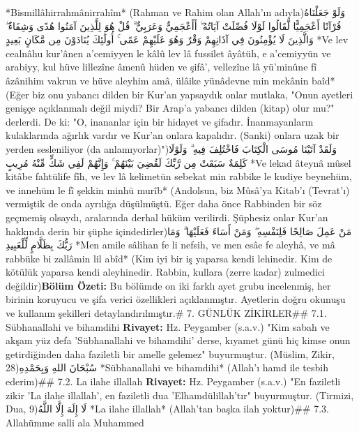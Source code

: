 \documentclass[12pt,a4paper]{article}
\begin{document}
{*Bismillâhirrahmânirrahîm*
(Rahman ve Rahim olan Allah'ın adıyla)وَلَوْ جَعَلْنَاهُ قُرْآنًا أَعْجَمِيًّا لَّقَالُوا لَوْلَا فُصِّلَتْ آيَاتُهُ ۖ أَأَعْجَمِيٌّ وَعَرَبِيٌّ ۗ قُلْ هُوَ لِلَّذِينَ آمَنُوا هُدًى وَشِفَاءٌ ۖ وَالَّذِينَ لَا يُؤْمِنُونَ فِي آذَانِهِمْ وَقْرٌ وَهُوَ عَلَيْهِمْ عَمًى ۚ أُولَٰئِكَ يُنَادَوْنَ مِن مَّكَانٍ بَعِيدٍ
*Ve lev cealnâhu kur'ânen a'cemiyyen le kâlû lev lâ fussilet âyâtüh, e a'cemiyyün ve arabiyy, kul hüve lillezîne âmenû hüden ve şifâ', vellezîne lâ yü'minûne fî âzânihim vakrun ve hüve aleyhim amâ, ülâike yünâdevne min mekânin baîd*
(Eğer biz onu yabancı dilden bir Kur'an yapsaydık onlar mutlaka, "Onun ayetleri genişçe açıklanmalı değil miydi? Bir Arap'a yabancı dilden (kitap) olur mu?" derlerdi. De ki: "O, inananlar için bir hidayet ve şifadır. İnanmayanların kulaklarında ağırlık vardır ve Kur'an onlara kapalıdır. (Sanki) onlara uzak bir yerden sesleniliyor (da anlamıyorlar)")وَلَقَدْ آتَيْنَا مُوسَى الْكِتَابَ فَاخْتُلِفَ فِيهِ ۗ وَلَوْلَا كَلِمَةٌ سَبَقَتْ مِن رَّبِّكَ لَقُضِيَ بَيْنَهُمْ ۚ وَإِنَّهُمْ لَفِي شَكٍّ مِّنْهُ مُرِيبٍ
*Ve lekad âteynâ mûsel kitâbe fahtülife fîh, ve lev lâ kelimetün sebekat min rabbike le kudiye beynehüm, ve innehüm le fî şekkin minhü murîb*
(Andolsun, biz Mûsâ'ya Kitab'ı (Tevrat'ı) vermiştik de onda ayrılığa düşülmüştü. Eğer daha önce Rabbinden bir söz geçmemiş olsaydı, aralarında derhal hüküm verilirdi. Şüphesiz onlar Kur'an hakkında derin bir şüphe içindedirler)مَنْ عَمِلَ صَالِحًا فَلِنَفْسِهِ ۖ وَمَنْ أَسَاءَ فَعَلَيْهَا ۗ وَمَا رَبُّكَ بِظَلَّامٍ لِّلْعَبِيدِ
*Men amile sâlihan fe li nefsih, ve men esâe fe aleyhâ, ve mâ rabbüke bi zallâmin lil abîd*
(Kim iyi bir iş yaparsa kendi lehinedir. Kim de kötülük yaparsa kendi aleyhinedir. Rabbin, kullara (zerre kadar) zulmedici değildir)\textbf{Bölüm Özeti:}
Bu bölümde on iki farklı ayet grubu incelenmiş, her birinin koruyucu ve şifa verici özellikleri açıklanmıştır. Ayetlerin doğru okunuşu ve kullanım şekilleri detaylandırılmıştır.\# 7. GÜNLÜK ZİKİRLER\#\# 7.1. Sübhanallahi ve bihamdihi
\textbf{Rivayet:} Hz. Peygamber (s.a.v.) "Kim sabah ve akşam yüz defa 'Sübhanallahi ve bihamdihi' derse, kıyamet günü hiç kimse onun getirdiğinden daha faziletli bir amelle gelemez" buyurmuştur. (Müslim, Zikir, 28)سُبْحَانَ اللهِ وَبِحَمْدِهِ
*Sübhanallahi ve bihamdihi*
(Allah'ı hamd ile tesbih ederim)\#\# 7.2. La ilahe illallah
\textbf{Rivayet:} Hz. Peygamber (s.a.v.) "En faziletli zikir 'La ilahe illallah', en faziletli dua 'Elhamdülillah'tır" buyurmuştur. (Tirmizi, Dua, 9)لَا إِلَهَ إِلَّا اللَّهُ
*La ilahe illallah*
(Allah'tan başka ilah yoktur)\#\# 7.3. Allahümme salli ala Muhammed
}
\end{document}
